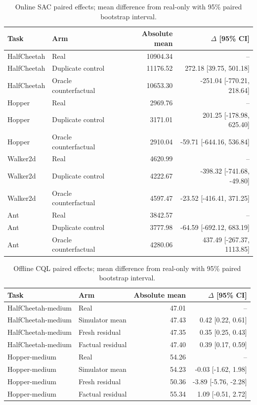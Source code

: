 \begin{table}[t]
\centering
\small
\caption{Online SAC paired effects; mean difference from real-only with 95\% paired bootstrap interval.}
\label{tab:sac_paired}
\begin{tabular}{llrr}
\toprule
Task & Arm & Absolute mean & $\Delta$ [95\% CI] \\
\midrule
HalfCheetah & Real & 10904.34 & -- \\
HalfCheetah & Duplicate control & 11176.52 & 272.18 [39.75, 501.18] \\
HalfCheetah & Oracle counterfactual & 10653.30 & -251.04 [-770.21, 218.64] \\
Hopper & Real & 2969.76 & -- \\
Hopper & Duplicate control & 3171.01 & 201.25 [-178.98, 625.40] \\
Hopper & Oracle counterfactual & 2910.04 & -59.71 [-644.16, 536.84] \\
Walker2d & Real & 4620.99 & -- \\
Walker2d & Duplicate control & 4222.67 & -398.32 [-741.68, -49.80] \\
Walker2d & Oracle counterfactual & 4597.47 & -23.52 [-416.41, 371.25] \\
Ant & Real & 3842.57 & -- \\
Ant & Duplicate control & 3777.98 & -64.59 [-692.12, 683.19] \\
Ant & Oracle counterfactual & 4280.06 & 437.49 [-267.37, 1113.85] \\
\bottomrule
\end{tabular}
\end{table}

\begin{table}[t]
\centering
\small
\caption{Offline CQL paired effects; mean difference from real-only with 95\% paired bootstrap interval.}
\label{tab:d4rl_paired}
\begin{tabular}{llrr}
\toprule
Task & Arm & Absolute mean & $\Delta$ [95\% CI] \\
\midrule
HalfCheetah-medium & Real & 47.01 & -- \\
HalfCheetah-medium & Simulator mean & 47.43 & 0.42 [0.22, 0.61] \\
HalfCheetah-medium & Fresh residual & 47.35 & 0.35 [0.25, 0.43] \\
HalfCheetah-medium & Factual residual & 47.40 & 0.39 [0.17, 0.59] \\
Hopper-medium & Real & 54.26 & -- \\
Hopper-medium & Simulator mean & 54.23 & -0.03 [-1.62, 1.98] \\
Hopper-medium & Fresh residual & 50.36 & -3.89 [-5.76, -2.28] \\
Hopper-medium & Factual residual & 55.34 & 1.09 [-0.51, 2.72] \\
\bottomrule
\end{tabular}
\end{table}

